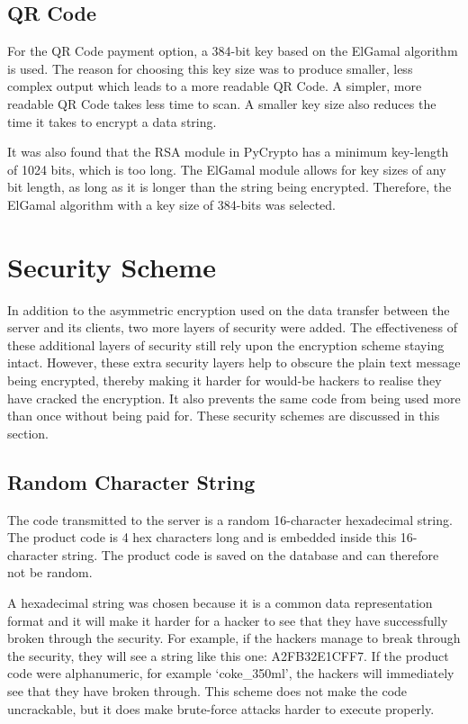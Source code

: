 \subsection{QR Code}

For the QR Code payment option, a 384-bit key based on the ElGamal algorithm is
used. The reason for choosing this key size was to produce smaller, less complex
output which leads to a more readable QR Code. A simpler, more readable QR Code
takes less time to scan. A smaller key size also reduces the time it takes to
encrypt a data string.

It was also found that the RSA module in PyCrypto has a minimum key-length of 1024
bits, which is too long. The ElGamal module allows for key sizes of any bit
length, as long as it is longer than the string being encrypted. Therefore,
the ElGamal algorithm with a key size of 384-bits was selected. 

\section{Security Scheme}
\label{sec:security-code-scheme}

In addition to the asymmetric encryption used on the data transfer between the
server and its clients, two more layers of security were added. The
effectiveness of these additional layers of security still rely upon the encryption scheme staying intact.
However, these extra security layers help to obscure the plain text message being
encrypted, thereby making it harder for would-be hackers to realise they have cracked the
encryption. It also prevents the same code from being used more than once without being
paid for. These security schemes are discussed in this section. 

\subsection{Random Character String}

The code transmitted to the server is a random 16-character hexadecimal string. The
product code is 4 hex characters long and is embedded inside this 16-character
string.
The product code is saved on the database and can therefore not be random. 

A hexadecimal string was chosen because it is a common data representation
format and it will make it harder for a hacker to see that they have
successfully broken through the security. For example, if the hackers manage to
break through the security, they will see a string like this one: A2FB32E1CFF7.
If the product code were alphanumeric, for example `coke\_350ml', the hackers will immediately
see that they have broken through. This scheme does not make the code uncrackable, but it
does make brute-force attacks harder to execute properly.


